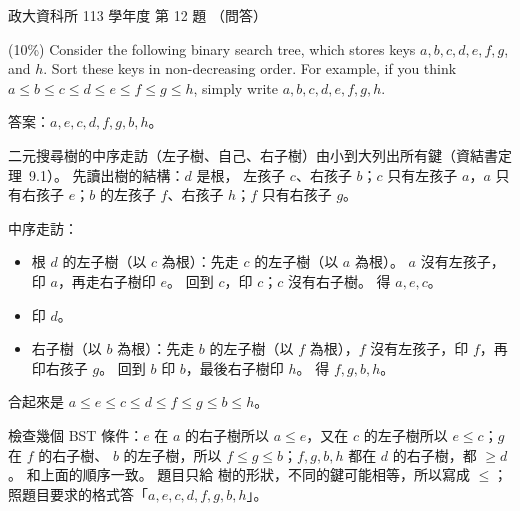\begin{pastexam}[label={px:nccu-113-dsa-12}]{政大資科所 113 學年度 第 12 題}
（問答）

(10\%) Consider the following binary search tree, which stores keys $a,b,c,d,e,f,g$, and $h$. Sort these
keys in non-decreasing order. For example, if you think $a\le b\le c\le d\le e\le f\le g\le h$, simply write
$a,b,c,d,e,f,g,h$.
\begin{center}
\end{center}
\end{pastexam}

\begin{pastsoln}
答案：$a, e, c, d, f, g, b, h$。

二元搜尋樹的中序走訪（左子樹、自己、右子樹）由小到大列出所有鍵（資結書定理~9.1）。 先讀出樹的結構：$d$ 是根，
左孩子 $c$、右孩子 $b$；$c$ 只有左孩子 $a$，$a$ 只有右孩子 $e$；$b$ 的左孩子 $f$、右孩子 $h$；$f$ 只有右孩子 $g$。

中序走訪：
\begin{itemize}
\item 根 $d$ 的左子樹（以 $c$ 為根）：先走 $c$ 的左子樹（以 $a$ 為根）。 $a$ 沒有左孩子，印 $a$，再走右子樹印
$e$。 回到 $c$，印 $c$；$c$ 沒有右子樹。 得 $a, e, c$。
\item 印 $d$。
\item 右子樹（以 $b$ 為根）：先走 $b$ 的左子樹（以 $f$ 為根），$f$ 沒有左孩子，印 $f$，再印右孩子 $g$。 回到 $b$
印 $b$，最後右子樹印 $h$。 得 $f, g, b, h$。
\end{itemize}
合起來是 $a \le e \le c \le d \le f \le g \le b \le h$。

檢查幾個 BST 條件：$e$ 在 $a$ 的右子樹所以 $a \le e$，又在 $c$ 的左子樹所以 $e \le c$；$g$ 在 $f$ 的右子樹、
$b$ 的左子樹，所以 $f \le g \le b$；$f, g, b, h$ 都在 $d$ 的右子樹，都 $\ge d$。 和上面的順序一致。 題目只給
樹的形狀，不同的鍵可能相等，所以寫成 $\le$；照題目要求的格式答「$a, e, c, d, f, g, b, h$」。
\end{pastsoln}
